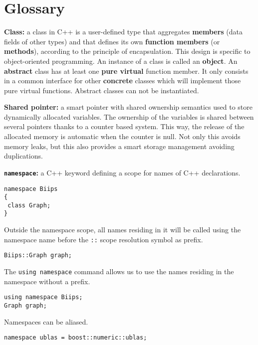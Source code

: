 \chapter*{Glossary}

\begin{list}{}{}
 \item[\textbf{Class:}] a class in C++ is a user-defined type that aggregates \textbf{members} (data fields of other types) and that defines its own \textbf{function members} (or \textbf{methods}), according to the principle of encapsulation. This design is specific to object-oriented programming. An instance of a class is called an \textbf{object}. An \textbf{abstract} class has at least one \textbf{pure virtual} function member. It only consists in a common interface for other \textbf{concrete} classes which will implement those pure virtual functions. Abstract classes can not be instantiated.




 \item[\textbf{Shared pointer:}] a smart pointer with shared ownership semantics used to store dynamically allocated variables. The ownership of the variables is shared between several pointers thanks to a counter based system. This way, the release of the allocated memory is automatic when the counter is null. Not only this avoids memory leaks, but this also provides a smart storage management avoiding duplications. 


 \item[\textbf{\texttt{namespace}:}] a C++ keyword defining a scope for names of C++ declarations.
\begin{verbatim}
namespace Biips
{
 class Graph;
}
\end{verbatim}
Outside the namespace scope, all names residing in it will be called using the namespace name before the \verb=::= scope resolution symbol as prefix.
\begin{verbatim}
Biips::Graph graph;
\end{verbatim}
The \verb=using namespace= command allows us to use the names residing in the namespace without a prefix.
\begin{verbatim}
using namespace Biips;
Graph graph;
\end{verbatim}
Namespaces can be aliased.
\begin{verbatim}
namespace ublas = boost::numeric::ublas;
\end{verbatim}



\end{list}
